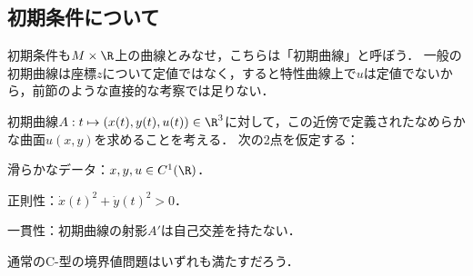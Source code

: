 \documentclass[uplatex,dvipdfmx]{jsreport}
\begin{document}
\subsection{初期条件について}

\begin{tcolorbox}[colframe=ForestGreen, colback=ForestGreen!10!white,breakable,colbacktitle=ForestGreen!40!white,coltitle=black,fonttitle=\bfseries\sffamily,
    title=]
    初期条件も$M\times\R$上の曲線とみなせ，こちらは「初期曲線」と呼ぼう．
    一般の初期曲線は座標$z$について定値ではなく，すると特性曲線上で$u$は定値でないから，前節のような直接的な考察では足りない．
\end{tcolorbox}

\begin{problem}
    初期曲線$A:t\mapsto(x(t),y(t),u(t))\in\R^3$に対して，この近傍で定義されたなめらかな曲面$u(x,y)$を求めることを考える．
    次の2点を仮定する：
    \begin{enumerate}[{[A}1{]}]
        \item 滑らかなデータ：$x,y,u\in C^1(\R)$．
        \item 正則性：$\dot{x}(t)^2+\dot{y}(t)^2>0$．
        \item 一貫性：初期曲線の射影$A'$は自己交差を持たない．
    \end{enumerate}
\end{problem}
\begin{remarks}
    通常のC-型の境界値問題はいずれも満たすだろう．
\end{remarks}
\end{document}

